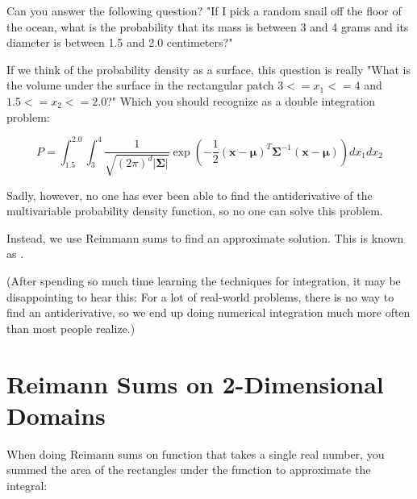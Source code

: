 Can you answer the following question? "If I pick a random snail off the floor of the ocean, what is the probability that its mass is between 3 and 4 grams
and its diameter is between 1.5 and 2.0 centimeters?"

If we think of the probability density as a surface, this question is really "What is the volume under the surface in the rectangular patch $3 <= x_1 <= 4$ and $1.5 <=x_2 <= 2.0$?"  Which you should recognize as a double integration problem:

\begin{equation*}
P = \int_{1.5}^{2.0} \int_{3}^4 \frac{1}{\sqrt{(2\pi)^d|\mathbf{\Sigma}|}}\exp\left(-\frac{1}{2}(\mathbf{x}-\boldsymbol\mu)^T\mathbf{\Sigma}^{-1}(\mathbf{x}-\boldsymbol\mu)\right) dx_1 dx_2
\end{equation*}

Sadly, however, no one has ever been able to find the antiderivative of the multivariable probability density function, so no one can solve this problem.

Instead, we use Reimmann sums to find an approximate solution.  This is known as .

(After spending so much time learning the techniques for integration, it may be disappointing to hear this:
For a lot of real-world problems, there is no way to find an antiderivative, so we end up doing numerical integration much more often than most people realize.)

\section{Reimann Sums on 2-Dimensional Domains}

When doing Reimann sums on function that takes a single real number, you summed the area of the rectangles under the function to approximate the integral:

